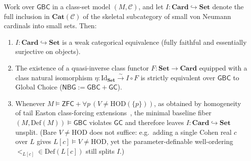 \begin{proposition}\label{prop:large-equiv-splitting}%
%
%
Work over $\mathsf{GBC}$ in a class-set model $(M, \mathcal{C})$, and let $I : \mathbf{Card} \hookrightarrow \mathbf{Set}$ denote the full inclusion in $\mathbf{Cat}(\mathcal{C})$ of the skeletal subcategory of small von Neumann cardinals into small sets. Then:
\begin{enumerate}
  \item $I : \mathbf{Card} \hookrightarrow \mathbf{Set}$ is a weak categorical equivalence (fully faithful and essentially surjective on objects).
  \item The existence of a quasi-inverse class functor $F : \mathbf{Set} \to \mathbf{Card}$ equipped with a class natural isomorphism $\eta : \mathrm{Id}_{\mathbf{Set}} \xrightarrow{\sim} I \circ F$ is strictly equivalent over $\mathsf{GBC}$ to Global Choice ($\mathsf{NBG} := \mathsf{GBC} + \mathsf{GC}$).
  \item Whenever $M \models \mathsf{ZFC} + \forall p\,(V \neq \mathrm{HOD}(\{p\}))$, as obtained by homogeneity of tail Easton class-forcing extensions~\cite{Easton70}, the minimal baseline fiber $(M, \mathrm{Def}(M)) \models \mathsf{GBC}$ violates $\mathsf{GC}$ and therefore leaves $I : \mathbf{Card} \hookrightarrow \mathbf{Set}$ unsplit. (Bare $V \neq \mathrm{HOD}$ does not suffice: e.g.\ adding a single Cohen real $c$ over $L$ gives $L[c] \models V \neq \mathrm{HOD}$, yet the parameter-definable well-ordering $<_{L[c]} \in \mathrm{Def}(L[c])$ still splits $I$.)
\end{enumerate}
\end{proposition}

